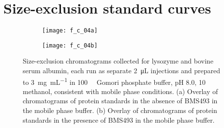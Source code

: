 \section{Size-exclusion standard curves}

\begin{figure}
    \centering
    \begin{subfigure}[b]{0.8\textwidth}
        \texttt{[image: f\_c\_04a]}
        \caption{}
    \end{subfigure}
    \begin{subfigure}[b]{0.8\textwidth}
        \texttt{[image: f\_c\_04b]}
        \caption{}
    \end{subfigure}
    \caption{Size-exclusion chromatograms collected for lysozyme and bovine
        serum albumin, each run as separate \SI{2}{\micro\liter} injections and
        prepared to \SI{3}{\mg\per\mL} in \SI{100}{\milli\moLar} Gomori
        phosphate buffer, pH 8.0, \SI{10}{\volper} methanol, consistent with
        mobile phase conditions. (a) Overlay of chromatograms of protein
        standards in the absence of BMS493 in the mobile phase buffer. (b)
        Overlay of chromatograms of protein standards in the presence of BMS493
        in the mobile phase buffer.}\label{fig:sec_standards}
\end{figure}

